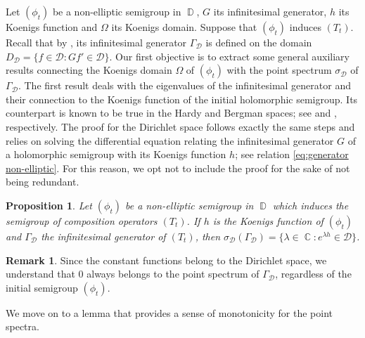 \documentclass[11pt]{amsart}
\numberwithin{equation}{section}
\newtheorem{proposition}[theorem]{Proposition}
\theoremstyle{definition}
\newtheorem{remark}[theorem]{Remark}
\DeclareMathOperator{\C}{\mathbb{C}}
\DeclareMathOperator{\D}{\mathbb{D}}
\begin{document}
	Let $(\phi_t)$ be a non-elliptic semigroup in $\D$, $G$ its infinitesimal generator, $h$ its Koenigs function and $\Omega$ its Koenigs domain. Suppose that $(\phi_t)$ induces $(T_t)$. Recall that by \cite[Theorem 1]{Siskakis-Dirichlet}, its infinitesimal generator $\Gamma_\mathcal{D}$ is defined on the domain $D_\mathcal{D}=\{f\in\mathcal{D}: Gf'\in\mathcal{D}\}$. Our first objective is to extract some general auxiliary results connecting the Koenigs domain $\Omega$ of $(\phi_t)$ with the point spectrum $\sigma_{\mathcal{D}}$ of $\Gamma_\mathcal{D}$. The first result deals with the eigenvalues of the infinitesimal generator and their connection to the Koenigs function of the initial holomorphic semigroup. Its counterpart is known to be true in the Hardy and Bergman spaces; see \cite[p.9]{siskakis_review} and \cite[Theorem 2]{Siskakis-Bergman}, respectively. The proof for the Dirichlet space follows exactly the same steps and relies on solving the differential equation relating the infinitesimal generator $G$ of a holomorphic semigroup with its Koenigs function $h$; see relation \eqref{eq:generator non-elliptic}. For this reason, we opt not to include the proof for the sake of not being redundant.
	
	\begin{proposition}\label{prop:dirichlet spectrum koenigs}
		Let $(\phi_t)$ be a non-elliptic semigroup in $\D$ which induces the semigroup of composition operators $(T_t)$. If $h$ is the Koenigs function of $(\phi_t)$ and $\Gamma_\mathcal{D}$ the infinitesimal generator of $(T_t)$, then $\sigma_{\mathcal{D}}(\Gamma_\mathcal{D})=\{\lambda\in\C:e^{\lambda h}\in\mathcal{D}\}$.
		
	\end{proposition}
	
	\begin{remark}\label{rem:dirichlet zero}
		Since the constant functions belong to the Dirichlet space, we understand that $0$ always belongs to the point spectrum of $\Gamma_\mathcal{D}$, regardless of the initial semigroup $(\phi_t)$.
	\end{remark}
	
	We move on to a lemma that provides a sense of monotonicity for the point spectra.
	
\end{document}
